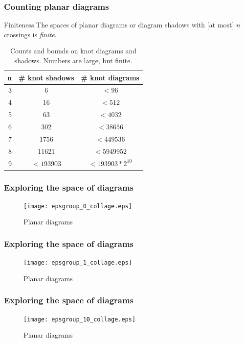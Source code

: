 \documentclass[presentation]{beamer}
\begin{document}
\begin{frame}
  \frametitle{Counting planar diagrams}
  \begin{block}{Finiteness}
   The spaces of planar
   diagrams or diagram shadows with [at most] $n$ crossings is
    \textit{finite}.
  \end{block}

  \begin{table}
    \centering
    \begin{tabular}{r|cc}
      n & \# knot shadows & \# knot diagrams \\
      \hline
      3 & 6 & $<96$ \\
      4 & 16 & $<512$ \\
      5 & 63 & $<4032$ \\
      6 & 302 & $<38656$ \\
      7 & 1756 & $<449536$ \\
      8 & 11621 & $<5949952$ \\
      9 & $<193903$ & $<193903 * 2^{10}$
    \end{tabular}
    \caption{Counts and bounds on knot diagrams and shadows. Numbers
      are large, but finite.}
    \label{tab:counts}
  \end{table}
\end{frame}

\begin{frame}
  \frametitle{Exploring the space of diagrams}
  \begin{figure}
    \centering
    \texttt{[image: epsgroup\_0\_collage.eps]}
    \caption{Planar diagrams}
    \label{fig:planarcollage0}
  \end{figure}
\end{frame}

\begin{frame}
  \frametitle{Exploring the space of diagrams}
  \begin{figure}
    \centering
    \texttt{[image: epsgroup\_1\_collage.eps]}
    \caption{Planar diagrams}
    \label{fig:planarcollage1}
  \end{figure}
\end{frame}

\begin{frame}
  \frametitle{Exploring the space of diagrams}
  \begin{figure}
    \centering
    \texttt{[image: epsgroup\_10\_collage.eps]}
    \caption{Planar diagrams}
    \label{fig:planarcollage10}
  \end{figure}
\end{frame}
\end{document}
